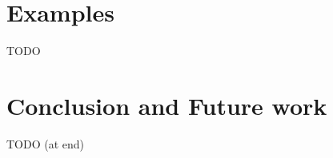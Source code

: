 \documentclass{article}
\begin{document}
\section{Examples}

TODO

\section{Conclusion and Future work}

TODO (at end)
\end{document}
